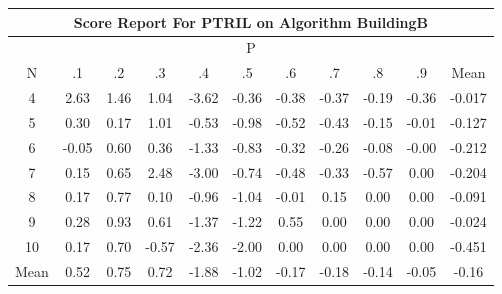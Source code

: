 \documentclass[11pt,a4paper]{report}
\begin{document}
\begin{longtable}{ | c || c | c | c | c | c | c | c | c | c || c |}
\hline
\multicolumn{11}{|c|}{ Score Report For PTRIL on Algorithm BuildingB} \\
\hline
\multicolumn{11}{|c|}{ P } \\
\hline
N & .1 & .2 & .3 & .4 & .5 & .6 & .7 & .8 & .9 & Mean\\
 \hline
 \hline
 \endhead
  4 &  \cellcolor[HTML]{BFBFFF} 2.63 &  \cellcolor[HTML]{D7D7FF} 1.46 &  \cellcolor[HTML]{E7E7FF} 1.04 &  \cellcolor[HTML]{FFA7A7} -3.62 &  \cellcolor[HTML]{FFF7F7} -0.36 &  \cellcolor[HTML]{FFF7F7} -0.38 &  \cellcolor[HTML]{FFF7F7} -0.37 &  \cellcolor[HTML]{FFF7F7} -0.19 &  \cellcolor[HTML]{FFF7F7} -0.36 & -0.017 \\
  5 &  \cellcolor[HTML]{F7F7FF} 0.30 &  \cellcolor[HTML]{F7F7FF} 0.17 &  \cellcolor[HTML]{E7E7FF} 1.01 &  \cellcolor[HTML]{FFEFEF} -0.53 &  \cellcolor[HTML]{FFE7E7} -0.98 &  \cellcolor[HTML]{FFEFEF} -0.52 &  \cellcolor[HTML]{FFF7F7} -0.43 &  \cellcolor[HTML]{FFFFFF} -0.15 &  \cellcolor[HTML]{FFFFFF} -0.01 & -0.127 \\
  6 &  \cellcolor[HTML]{FFFFFF} -0.05 &  \cellcolor[HTML]{EFEFFF} 0.60 &  \cellcolor[HTML]{F7F7FF} 0.36 &  \cellcolor[HTML]{FFDFDF} -1.33 &  \cellcolor[HTML]{FFE7E7} -0.83 &  \cellcolor[HTML]{FFF7F7} -0.32 &  \cellcolor[HTML]{FFF7F7} -0.26 &  \cellcolor[HTML]{FFFFFF} -0.08 &  \cellcolor[HTML]{FFFFFF} -0.00 & -0.212 \\
  7 &  \cellcolor[HTML]{FFFFFF} 0.15 &  \cellcolor[HTML]{EFEFFF} 0.65 &  \cellcolor[HTML]{BFBFFF} 2.48 &  \cellcolor[HTML]{FFB7B7} -3.00 &  \cellcolor[HTML]{FFEFEF} -0.74 &  \cellcolor[HTML]{FFF7F7} -0.48 &  \cellcolor[HTML]{FFF7F7} -0.33 &  \cellcolor[HTML]{FFEFEF} -0.57 &  \cellcolor[HTML]{FFFFFF} 0.00 & -0.204 \\
  8 &  \cellcolor[HTML]{F7F7FF} 0.17 &  \cellcolor[HTML]{EFEFFF} 0.77 &  \cellcolor[HTML]{FFFFFF} 0.10 &  \cellcolor[HTML]{FFE7E7} -0.96 &  \cellcolor[HTML]{FFE7E7} -1.04 &  \cellcolor[HTML]{FFFFFF} -0.01 &  \cellcolor[HTML]{FFFFFF} 0.15 &  \cellcolor[HTML]{FFFFFF} 0.00 &  \cellcolor[HTML]{FFFFFF} 0.00 & -0.091 \\
  9 &  \cellcolor[HTML]{F7F7FF} 0.28 &  \cellcolor[HTML]{E7E7FF} 0.93 &  \cellcolor[HTML]{EFEFFF} 0.61 &  \cellcolor[HTML]{FFDFDF} -1.37 &  \cellcolor[HTML]{FFDFDF} -1.22 &  \cellcolor[HTML]{EFEFFF} 0.55 &  \cellcolor[HTML]{FFFFFF} 0.00 &  \cellcolor[HTML]{FFFFFF} 0.00 &  \cellcolor[HTML]{FFFFFF} 0.00 & -0.024 \\
  10 &  \cellcolor[HTML]{F7F7FF} 0.17 &  \cellcolor[HTML]{EFEFFF} 0.70 &  \cellcolor[HTML]{FFEFEF} -0.57 &  \cellcolor[HTML]{FFC7C7} -2.36 &  \cellcolor[HTML]{FFCFCF} -2.00 &  \cellcolor[HTML]{FFFFFF} 0.00 &  \cellcolor[HTML]{FFFFFF} 0.00 &  \cellcolor[HTML]{FFFFFF} 0.00 &  \cellcolor[HTML]{FFFFFF} 0.00 & -0.451 \\
 \hline
 \hline
Mean &  \cellcolor[HTML]{EFEFFF} 0.52 &  \cellcolor[HTML]{EFEFFF} 0.75 &  \cellcolor[HTML]{EFEFFF} 0.72 &  \cellcolor[HTML]{FFCFCF} -1.88 &  \cellcolor[HTML]{FFE7E7} -1.02 &  \cellcolor[HTML]{FFF7F7} -0.17 &  \cellcolor[HTML]{FFF7F7} -0.18 &  \cellcolor[HTML]{FFFFFF} -0.14 &  \cellcolor[HTML]{FFFFFF} -0.05 &  \cellcolor[HTML]{FFF7F7} -0.16
\end{longtable}
\end{document}
